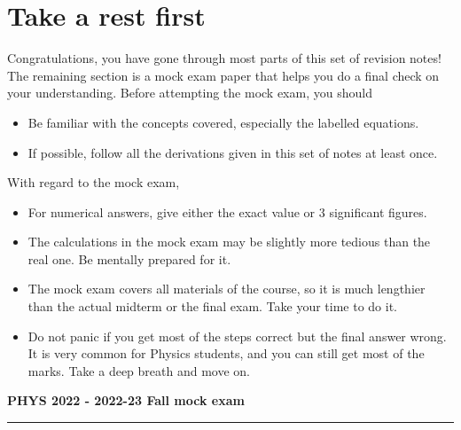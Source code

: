 \documentclass[12pt]{book} %
\numberwithin{equation}{chapter}
\begin{document}
\section*{Take a rest first}
Congratulations, you have gone through most parts of this set of revision notes! The remaining section is a mock exam paper that helps you do a final check on your understanding.\bigskip\newline
Before attempting the mock exam, you should
\begin{itembox}
\begin{itemize}
\item Be familiar with the concepts covered, especially the labelled equations.
\item If possible, follow all the derivations given in this set of notes at least once.
\end{itemize}
\end{itembox}
With regard to the mock exam,
\begin{itembox}
\begin{itemize}
\item For numerical answers, give either the exact value or 3 significant figures.
\item The calculations in the mock exam may be slightly more tedious than the real one. Be mentally prepared for it.
\item The mock exam covers all materials of the course, so it is much lengthier than the actual midterm or the final exam. Take your time to do it.
\item Do not panic if you get most of the steps correct but the final answer wrong. It is very common for Physics students, and you can still get most of the marks. Take a deep breath and move on.
\end{itemize}
\end{itembox}

\newpage
{}
\begin{center}
\textbf{\LARGE PHYS 2022 - 2022-23 Fall mock exam}
\rule{16.5cm}{1pt}
\end{center}
\vspace{-0.5cm}
\end{document}
